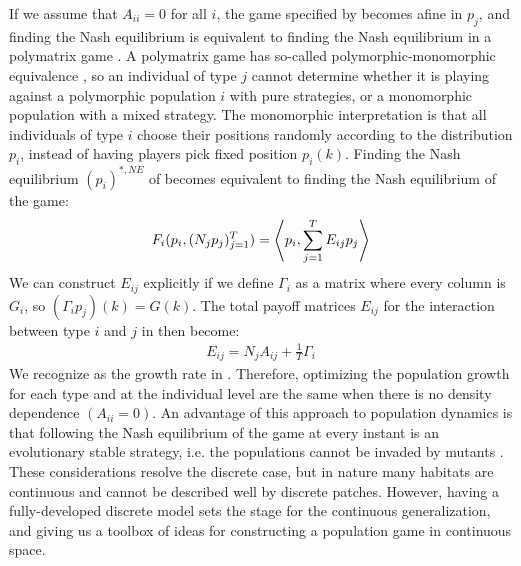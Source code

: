 

If we assume that $A_{ii}=0$ for all $i$, the game specified by  becomes afine in $p_j$, and finding the Nash equilibrium is equivalent to finding the Nash equilibrium in a polymatrix game \citep{howson1972equilibria, eaves1973polymatrix}. A polymatrix game has so-called polymorphic-monomorphic equivalence \citep{broom2013game, eaves1973polymatrix}, so an individual of type $j$ cannot determine whether it is playing against a polymorphic population $i$ with pure strategies, or a monomorphic population with a mixed strategy. The monomorphic interpretation is that all individuals of type $i$ choose their positions randomly according to the distribution $p_i$, instead of having players pick fixed position $p_i(k)$. Finding the Nash equilibrium $(p_i)^{*,NE}$ of  becomes equivalent to finding the Nash equilibrium of the game:
\begin{equation}
  \label{eq:poly_fitness}
  F_i(p_i, (N_j p_j)_{j=1}^T) = \left \langle p_i,\sum_{j=1}^T E_{ij} p_j \right \rangle
\end{equation}
We can construct $E_{ij}$ explicitly if we define $\Gamma_i$ as a matrix where every column is $G_i$, so $(\Gamma_i p_j)(k) = G(k)$. The total payoff matrices $E_{ij}$ for the interaction between type $i$ and $j$ in  then become:
\begin{equation}
  \label{eq:disc_tot_payoff}
  \begin{split}
    E_{ij} = N_j A_{ij} + \frac{1}{T}\Gamma_i%
  \end{split}
\end{equation}
We recognize  as the growth rate in . Therefore, optimizing the population growth for each type and at the individual level are the same when there is no density dependence $(A_{ii}=0)$. An advantage of this approach to population dynamics is that following the Nash equilibrium of the game  at every instant is an evolutionary stable strategy, i.e. the populations cannot be invaded by mutants \citep{kvrivan2009evolutionary}. These considerations resolve the discrete case, but in nature many habitats are continuous and cannot be described well by discrete patches. However, having a fully-developed discrete model sets the stage for the continuous generalization, and giving us a toolbox of ideas for constructing a population game in continuous space.

